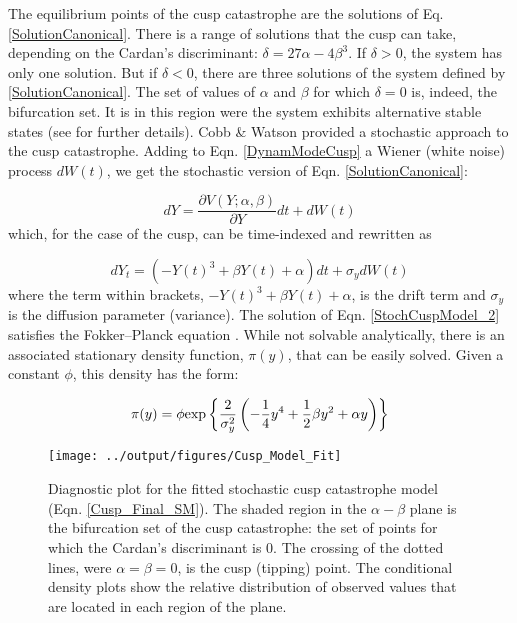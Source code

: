 \documentclass[11pt]{article}
\begin{document}
{The equilibrium points of the cusp catastrophe are the solutions of Eq. \ref{SolutionCanonical}. There is a range of solutions that the cusp can take, depending on the Cardan's discriminant: $ \delta = 27\alpha - 4\beta^3 $. If $ \delta > 0 $, the system has only one solution. But if $ \delta < 0 $, there are three solutions of the system defined by \ref{SolutionCanonical}. The set of values of $ \alpha $ and $ \beta $ for which $ \delta = 0 $ is, indeed, the bifurcation set. It is in this region were the system exhibits alternative stable states (see \cite{Thom1975,Poston1979,Casti1979,Grasman2009} for further details). Cobb \& Watson \cite{Cobb1980} provided a stochastic approach to the cusp catastrophe. Adding to Eqn. \ref{DynamModeCusp} a Wiener (white noise) process $ dW(t) $, we get the stochastic version of Eqn. \ref{SolutionCanonical}:

\begin{equation}\label{StochCuspModel_1}
	dY = \dfrac{\partial V(Y; \alpha,\beta)}{\partial Y}dt + dW(t)
\end{equation}
which, for the case of the cusp, can be time-indexed and rewritten as

\begin{equation}\label{StochCuspModel_2}
	dY_{t} = (-Y(t)^3 + \beta Y(t) + \alpha)dt + \sigma_{y} dW(t)
\end{equation}
where the term within brackets, $-Y(t)^3 + \beta Y(t) + \alpha $, is the drift term and $ \sigma_{y} $ is the diffusion parameter (variance). The solution of Eqn. \ref{StochCuspModel_2} satisfies the Fokker–Planck equation \cite{Zeeman1988}. While not solvable analytically, there is an associated stationary density function, $\pi (y)$, that can be easily solved. Given a constant $\phi$, this density has the form:

\begin{equation}\label{CuspStatDensity}
	\pi (y) = \phi \text{exp} \left\{ \frac{2}{\sigma_{y}^2} \left(-\frac{1}{4} y^4 + \frac{1}{2}\beta y^2 + \alpha y \large\right)\right\}
\end{equation}

\renewcommand{\thefigure}{S4}
\begin{figure}[t]
	\centering
	\texttt{[image: ../output/figures/Cusp\_Model\_Fit]}
	\caption[Diagnostic plot for the fitted stochastic cusp catastrophe model]{Diagnostic plot for the fitted stochastic cusp catastrophe model (Eqn. \ref{Cusp_Final_SM}). The shaded region in the  $ \alpha-\beta $ plane is the bifurcation set of the cusp catastrophe: the set of points for which the Cardan's discriminant is 0. The crossing of the dotted lines, were $ \alpha = \beta = 0 $, is the cusp (tipping) point. The conditional density plots show the relative distribution of observed values that are located in each region of the plane.}
	\label{fig:Cusp_Model_Fit}
\end{figure}

}
\end{document}
